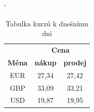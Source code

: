 \documentclass[a4paper,11pt]{article}
\begin{document}
\begin{table}[ht]

\catcode`
\begin{center}
\begin{tabular}{|c|c|c|}
\hline
    & \multicolumn{2}{|c|}{\bfseries{Cena}}           \\ \cline{2-3} 
\bfseries{Měna}   & \bfseries{nákup}   & \bfseries{prodej}    \\ \hline
EUR                      & 27,34                      & 27,42                       \\ 
GBP                      & 33,09                      & 33,21                       \\ 
USD		       & 19,87		          & 19,95 		   \\ \hline
\end{tabular}
\caption{Tabulka kurzů k dnešnímu dni}
\label{tab1}
\end{center}
\end{table}
\end{document}
